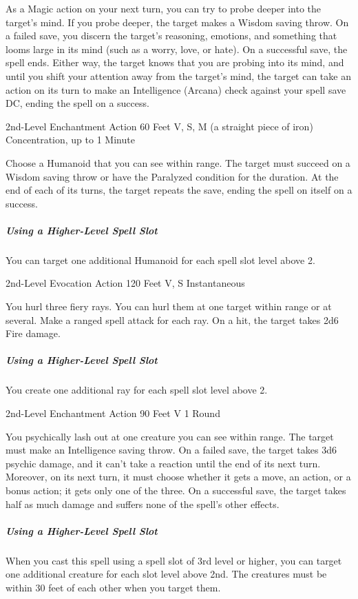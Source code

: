 \documentclass[letterpaper,openany,oneside,twocolumn]{book}
\begin{document}
As a Magic action on your next turn, you can try to probe deeper into the target's mind. If you probe deeper, the target makes a Wisdom saving throw. On a failed save, you discern the target's reasoning, emotions, and something that looms large in its mind (such as a worry, love, or hate). On a successful save, the spell ends. Either way, the target knows that you are probing into its mind, and until you shift your attention away from the target's mind, the target can take an action on its turn to make an Intelligence (Arcana) check against your spell save DC, ending the spell on a success.

	{2nd-Level Enchantment}
	{Action}
	{60 Feet}
	{V, S, M (a straight piece of iron)}
	{Concentration, up to 1 Minute}

Choose a Humanoid that you can see within range. The target must succeed on a Wisdom saving throw or have the Paralyzed condition for the duration. At the end of each of its turns, the target repeats the save, ending the spell on itself on a success.

\subparagraph*{Using a Higher-Level Spell Slot} You can target one additional Humanoid for each spell slot level above 2.

	{2nd-Level Evocation}
	{Action}
	{120 Feet}
	{V, S}
	{Instantaneous}

You hurl three fiery rays. You can hurl them at one target within range or at several. Make a ranged spell attack for each ray. On a hit, the target takes 2d6 Fire damage.

\subparagraph*{Using a Higher-Level Spell Slot} You create one additional ray for each spell slot level above 2.

	{2nd-Level Enchantment}
	{Action}
	{90 Feet}
	{V}
	{1 Round}

You psychically lash out at one creature you can see within range. The target must make an Intelligence saving throw. On a failed save, the target takes 3d6 psychic damage, and it can't take a reaction until the end of its next turn. Moreover, on its next turn, it must choose whether it gets a move, an action, or a bonus action; it gets only one of the three. On a successful save, the target takes half as much damage and suffers none of the spell's other effects.

\subparagraph*{Using a Higher-Level Spell Slot} When you cast this spell using a spell slot of 3rd level or higher, you can target one additional creature for each slot level above 2nd. The creatures must be within 30 feet of each other when you target them.
\end{document}

